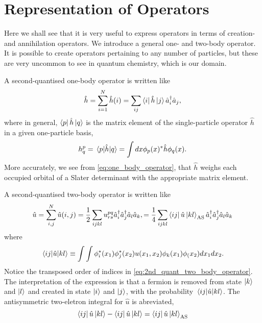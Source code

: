 \section{Representation of Operators}
    
    Here we shall see that it is very useful to express operators in terms of 
    creation- and annihilation operators. We introduce a general one- and two-body 
    operator. It is possible to create operators pertaining to any number of particles,
    but these are very uncommon to see in quantum chemistry, which is our domain.

    A second-quantised one-body operator is written like
    \begin{equation}
        \label{eq:one_body_operator}
        \hat{h} = \sum_{i=1}^N \hat{h}(i) 
        = \sum_{ij} \bra{i} \hat{h} \ket{j}\hat{a}_i^\dagger \hat{a}_j,
    \end{equation}
    where in general, $\bra{p} \hat{h} \ket{q}$ is the matrix element of the single-particle
    operator $\hat{h}$ in a given one-particle basis,
    \begin{equation}
        h^p_q = \mel{p}{\hat{h}}{q} = \int dx \phi_p(x)^* \hat{h} \phi_q(x).
    \end{equation}
    More accurately, we see from \autoref{eq:one_body_operator}, that $\hat{h}$
    weighs each occupied orbital of a Slater determinant with the appropriate 
    matrix element. 

    A second-quantised two-body operator is written like
    \begin{equation}
        \label{eq:2nd_quant_two_body_operator}
        \hat{u} = \sum_{i, j}^N\hat{u}(i,j) 
       = \frac{1}{2} \sum_{ijkl} u^{pq}_{rs}
            \hat{a}_i^\dagger \hat{a}_j^\dagger \hat{a}_l \hat{a}_k,
        = \frac{1}{4} \sum_{ijkl} \bra{ij}\hat{u}\ket{kl}_\text{AS} 
            \hat{a}_i^\dagger \hat{a}_j^\dagger \hat{a}_l \hat{a}_k
    \end{equation}
    where 
    \begin{equation}
        \mel{ij}{\hat{u}}{kl} 
        \equiv \int \int \phi_i^*(x_1) \phi_j^*(x_2)u(x_1, x_2) \phi_k(x_1)\phi_(x_2)
            dx_1 dx_2.
    \end{equation} 
    Notice the transposed order of indices in \ref{eq:2nd_quant_two_body_operator}.
    The interpretation of the expression is that a fermion is removed from state 
    $\ket{k}$ and $\ket{l}$ and created in state $\ket{i}$ and $\ket{j}$, with 
    the probability $\mel{ij}{\hat{u}}{kl}$.
    The antisymmetric two-eletron integral for $\hat{u}$ is abreviated,
    \begin{equation}
        \bra{ij} \hat{u}\ket{kl} - \bra{ij}\hat{u} \ket{kl} 
        = \bra{ij}\hat{u} \ket{kl}_\text{AS}
    \end{equation}

